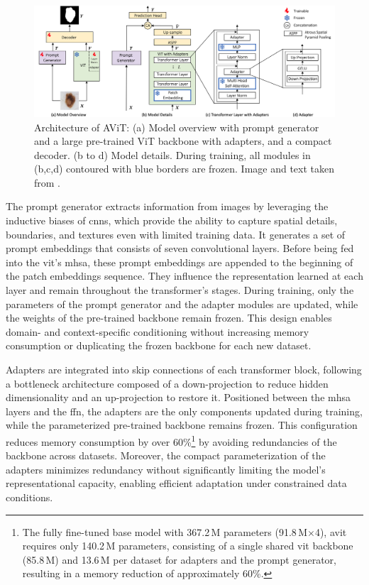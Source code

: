 \begin{figure}[H]
	\centering
	\includegraphics[width=1.0\textwidth]{./images/AViT_architecture.png}
	\caption[Architecture of AViT]{Architecture of AViT: (a) Model overview with prompt generator and a large pre-trained ViT backbone with adapters, and a compact decoder. (b to d) Model details. During training, all modules in (b,c,d) contoured with blue borders are frozen. Image and text taken from \cite{du2024avitadaptingvisiontransformers}.}
	\label{Architecture_of_AVIT}
\end{figure}

The prompt generator extracts information from images by leveraging the inductive biases of \glspl{cnn}, which provide the ability to capture spatial details, boundaries, and textures even with limited training data. It generates a set of prompt embeddings that consists of seven convolutional layers. Before being fed into the \gls{vit}'s \gls{mhsa}, these prompt embeddings are appended to the beginning of the patch embeddings sequence. They influence the representation learned at each layer and remain throughout the transformer's stages. During training, only the parameters of the prompt generator and the adapter modules are updated, while the weights of the pre-trained backbone remain frozen. This design enables domain- and context-specific conditioning without increasing memory consumption or duplicating the frozen backbone for each new dataset.

\medskip

Adapters are integrated into skip connections of each transformer block, following a bottleneck architecture composed of a down-projection to reduce hidden dimensionality and an up-projection to restore it. Positioned between the \gls{mhsa} layers and the \gls{ffn}, the adapters are the only components updated during training, while the parameterized pre-trained backbone remains frozen. This configuration reduces memory consumption by over 60\%\footnote{The fully fine-tuned base model with 367.2\,M parameters (91.8\,M$\times$4), \gls{avit} requires only 140.2\,M parameters, consisting of a single shared \gls{vit} backbone (85.8\,M) and 13.6\,M per dataset for adapters and the prompt generator, resulting in a memory reduction of approximately 60\%.} by avoiding redundancies of the backbone across datasets. Moreover, the compact parameterization of the adapters minimizes redundancy without significantly limiting the model's representational capacity, enabling efficient adaptation under constrained data conditions.

